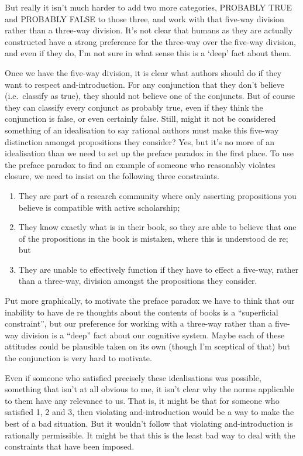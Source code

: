 \documentclass[11pt,]{book}
\providecommand{\tightlist}{%
  \setlength{\itemsep}{0pt}\setlength{\parskip}{0pt}}
\begin{document}
But really it isn't much harder to add two more categories, PROBABLY TRUE and PROBABLY FALSE to those three, and work with that five-way division rather than a three-way division. It's not clear that humans as they are actually constructed have a strong preference for the three-way over the five-way division, and even if they do, I'm not sure in what sense this is a `deep' fact about them.

Once we have the five-way division, it is clear what authors should do if they want to respect and-introduction. For any conjunction that they don't believe (i.e.~classify as true), they should not believe one of the conjuncts. But of course they can classify every conjunct as probably true, even if they think the conjunction is false, or even certainly false. Still, might it not be considered something of an idealisation to say rational authors must make this five-way distinction amongst
propositions they consider? Yes, but it's no more of an idealisation than we need to set up the preface paradox in the first place. To use the preface paradox to find an example of someone who reasonably violates closure, we need to insist on the following three constraints.

\begin{enumerate}
\def\labelenumi{\arabic{enumi}.}
\tightlist
\item
  They are part of a research community where only asserting propositions you believe is compatible with active scholarship;
\item
  They know exactly what is in their book, so they are able to believe that one of the propositions in the book is mistaken, where this is understood de re; but
\item
  They are unable to effectively function if they have to effect a five-way, rather than a three-way, division amongst the propositions they consider.
\end{enumerate}

Put more graphically, to motivate the preface paradox we have to think that our inability to have de re thoughts about the contents of books is a ``superficial constraint'', but our preference for working with a three-way rather than a five-way division is a ``deep'' fact about our cognitive system. Maybe each of these attitudes could be plausible taken on its own (though I'm sceptical of that) but the conjunction is very hard to motivate.

Even if someone who satisfied precisely these idealisations was possible, something that isn't at all obvious to me, it isn't clear why the norms applicable to them have any relevance to us. That is, it might be that for someone who satisfied 1, 2 and 3, then violating and-introduction would be a way to make the best of a bad situation. But it wouldn't follow that violating and-introduction is rationally permissible. It might be that this is the least bad way to deal with the constraints that have been imposed.
\end{document}

